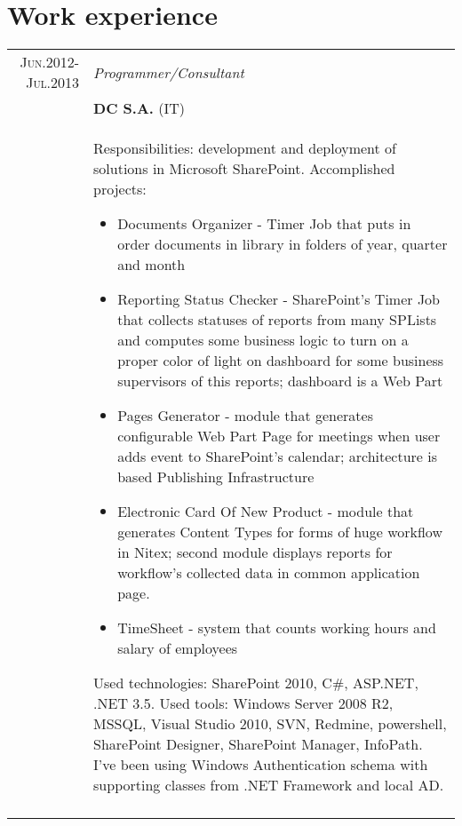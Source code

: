 \documentclass[a4paper,12pt]{article}
\begin{document}
\section{Work experience}
\begin{tabular}{r|p{11cm}}
	\textsc{Jun.2012-Jul.2013}
	&\emph{Programmer/Consultant} \\
	&\textsc{\textbf{DC S.A.}} (IT) \\
	&\footnotesize{
		Responsibilities: development and deployment of solutions in Microsoft SharePoint. \newline
		Accomplished projects:
		\begin{itemize}
			\item Documents Organizer - Timer Job that puts in order documents in library in folders of year, quarter and month
			\item Reporting Status Checker - SharePoint's Timer Job that collects statuses of reports from many SPLists and computes some business logic to
												turn
                                             on a proper color of light on dashboard for some business supervisors of this reports; dashboard is a Web Part
			\item Pages Generator - module that generates configurable Web Part Page for meetings when user adds event to SharePoint's calendar;
			architecture is based Publishing Infrastructure
			\item Electronic Card Of New Product - module that generates Content Types for forms of huge workflow in Nitex; second module displays reports
			for workflow's collected data in common application page.
			\item TimeSheet - system that counts working hours and salary of employees
		\end{itemize}
		Used technologies: SharePoint 2010, C\#, ASP.NET, .NET 3.5. Used tools: Windows Server 2008 R2, MSSQL, Visual Studio 2010,
		SVN, Redmine, powershell, SharePoint Designer, SharePoint Manager, InfoPath.
		I've been using Windows Authentication schema with supporting classes from .NET Framework and local AD.
	}\\
	\multicolumn{2}{c}{}\\


\end{tabular}
\end{document}
